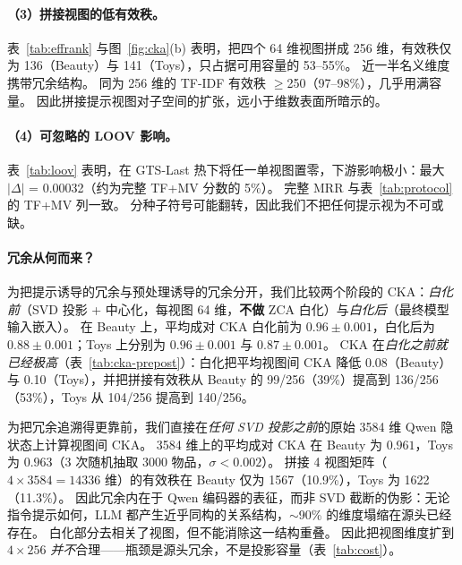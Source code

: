 \documentclass[sigconf,natbib=true,anonymous]{acmart}
\newcommand{\tfmv}{\textsc{TF+MV}\xspace}
\begin{document}
\paragraph{（3）拼接视图的低有效秩。}
表~\ref{tab:effrank} 与图~\ref{fig:cka}(b) 表明，把四个 64 维视图拼成 256 维，有效秩仅为 136（Beauty）与 141（Toys），只占据可用容量的 53--55\%。
近一半名义维度携带冗余结构。
同为 256 维的 TF-IDF 有效秩 $\ge$250（97--98\%），几乎用满容量。
因此拼接提示视图对子空间的扩张，远小于维数表面所暗示的。

\paragraph{（4）可忽略的 LOOV 影响。}
表~\ref{tab:loov} 表明，在 GTS-Last 热下将任一单视图置零，下游影响极小：最大 $|\Delta|$ = 0.00032（约为完整 \tfmv 分数的 5\%）。
完整 MRR 与表~\ref{tab:protocol} 的 \tfmv 列一致。
分种子符号可能翻转，因此我们不把任何提示视为不可或缺。

\paragraph{冗余从何而来？}
为把提示诱导的冗余与预处理诱导的冗余分开，我们比较两个阶段的 CKA：\emph{白化前}（SVD 投影 + 中心化，每视图 64 维，\textbf{不做} ZCA 白化）与\emph{白化后}（最终模型输入嵌入）。
在 Beauty 上，平均成对 CKA 白化前为 $0.96\pm0.001$，白化后为 $0.88\pm0.001$；Toys 上分别为 $0.96\pm0.001$ 与 $0.87\pm0.001$。
CKA 在\emph{白化之前就已经极高}（表~\ref{tab:cka-prepost}）：白化把平均视图间 CKA 降低 0.08（Beauty）与 0.10（Toys），并把拼接有效秩从 Beauty 的 99/256（39\%）提高到 136/256（53\%），Toys 从 104/256 提高到 140/256。

为把冗余追溯得更靠前，我们直接在\emph{任何 SVD 投影之前}的原始 3584 维 Qwen 隐状态上计算视图间 CKA。
3584 维上的平均成对 CKA 在 Beauty 为 $0.961$，Toys 为 $0.963$（3 次随机抽取 3000 物品，$\sigma < 0.002$）。
拼接 4 视图矩阵（$4\times 3584 = 14336$ 维）的有效秩在 Beauty 仅为 1567（10.9\%），Toys 为 1622（11.3\%）。
因此冗余内在于 Qwen 编码器的表征，而非 SVD 截断的伪影：无论指令提示如何，LLM 都产生近乎同构的关系结构，$\sim$90\% 的维度塌缩在源头已经存在。
白化部分去相关了视图，但不能消除这一结构重叠。
因此把视图维度扩到 $4\times256$ \emph{并不}合理——瓶颈是源头冗余，不是投影容量（表~\ref{tab:cost}）。
\end{document}
